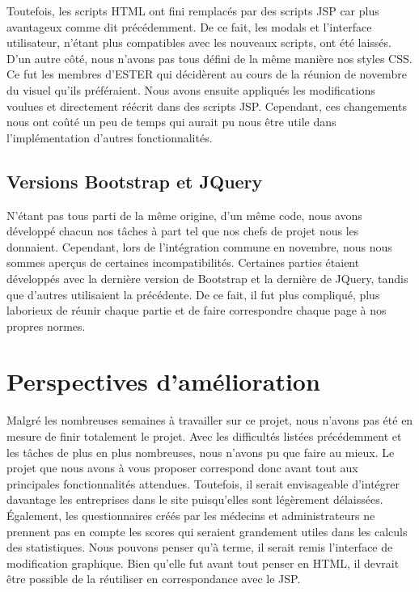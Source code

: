 Toutefois, les scripts HTML ont fini remplacés par des scripts JSP car plus avantageux comme dit précédemment. De ce fait, les modals et l'interface utilisateur, n'étant plus compatibles avec les nouveaux scripts, ont été laissés. D'un autre côté, nous n'avons pas tous défini de la même manière nos styles CSS. Ce fut les membres d'ESTER qui décidèrent au cours de la réunion de novembre du visuel qu'ils préféraient. Nous avons ensuite appliqués les modifications voulues et directement réécrit dans des scripts JSP. Cependant, ces changements nous ont coûté un peu de temps qui aurait pu nous être utile dans l'implémentation d'autres fonctionnalités.

\subsection{Versions Bootstrap et JQuery}

N'étant pas tous parti de la même origine, d'un même code, nous avons développé chacun nos tâches à part tel que nos chefs de projet nous les donnaient. Cependant, lors de l'intégration commune en novembre, nous nous sommes aperçus de certaines incompatibilités. Certaines parties étaient développés avec la dernière version de Bootstrap et la dernière de JQuery, tandis que d'autres utilisaient la précédente. 
De ce fait, il fut plus compliqué, plus laborieux de réunir chaque partie et de faire correspondre chaque page à nos propres normes. 


\section{Perspectives d'amélioration}

Malgré les nombreuses semaines à travailler sur ce projet, nous n'avons pas été en mesure de finir totalement le projet. Avec les difficultés listées précédemment et les tâches de plus en plus nombreuses, nous n'avons pu que faire au mieux. 
Le projet que nous avons à vous proposer correspond donc avant tout aux principales fonctionnalités attendues. Toutefois, il serait envisageable d'intégrer davantage les entreprises dans le site puisqu'elles sont légèrement délaissées. 
Également, les questionnaires créés par les médecins et administrateurs ne prennent pas en compte les scores qui seraient grandement utiles dans les calculs des statistiques. 
Nous pouvons penser qu'à terme, il serait remis l'interface de modification graphique. Bien qu'elle fut avant tout penser en HTML, il devrait être possible de la réutiliser en correspondance avec le JSP. 
